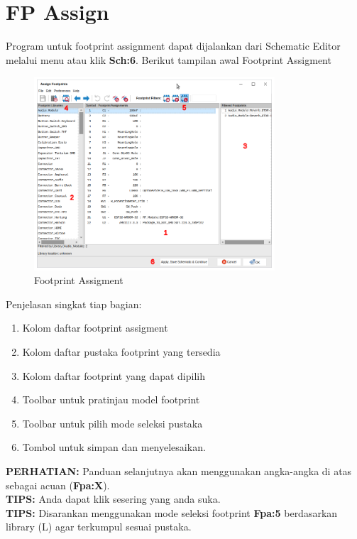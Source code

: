 \documentclass[12pt]{book}
\begin{document}
	\section{FP Assign}
	Program untuk footprint assignment dapat dijalankan dari Schematic Editor melalui
	menu  atau klik \textbf{Sch:6}.
	Berikut tampilan awal Footprint Assigment
	\begin{figure}[!ht]
		\centering
		\includegraphics[width=0.8\textwidth]{images/fpa/fpa_1}
		\caption{Footprint Assigment}
	\end{figure}

	Penjelasan singkat tiap bagian:
	\begin{enumerate}[label=\textbf{\arabic*}.]
		\item Kolom daftar footprint assigment
		\item Kolom daftar pustaka footprint yang tersedia
		\item Kolom daftar footprint yang dapat dipilih
		\item Toolbar untuk pratinjau model footprint
		\item Toolbar untuk pilih mode seleksi pustaka
		\item Tombol untuk simpan dan menyelesaikan.
	\end{enumerate}

	\textbf{PERHATIAN:} Panduan selanjutnya akan menggunakan angka-angka di atas sebagai acuan (\textbf{Fpa:X}).\\

	\textbf{TIPS:} Anda dapat klik  sesering yang anda suka.\\

	\textbf{TIPS:} Disarankan menggunakan mode seleksi footprint \textbf{Fpa:5} berdasarkan library (L) agar terkumpul sesuai pustaka.\\
\end{document}
